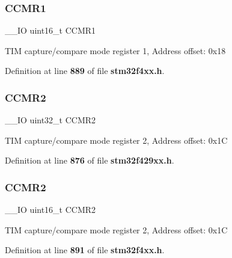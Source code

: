 \mbox{\label{structTIM__TypeDef_a90d89aec51d8012b8a565ef48333b24b}} 
\subsubsection{C\+C\+M\+R1\hspace{0.1cm}{\footnotesize\ttfamily [2/2]}}
{\footnotesize\ttfamily \+\_\+\+\_\+\+IO uint16\+\_\+t C\+C\+M\+R1}

T\+IM capture/compare mode register 1, Address offset\+: 0x18 

Definition at line \textbf{ 889} of file \textbf{ stm32f4xx.\+h}.

\mbox{\label{structTIM__TypeDef_a091452256c9a16c33d891f4d32b395bf}} 
\subsubsection{C\+C\+M\+R2\hspace{0.1cm}{\footnotesize\ttfamily [1/2]}}
{\footnotesize\ttfamily \+\_\+\+\_\+\+IO uint32\+\_\+t C\+C\+M\+R2}

T\+IM capture/compare mode register 2, Address offset\+: 0x1C 

Definition at line \textbf{ 876} of file \textbf{ stm32f429xx.\+h}.

\mbox{\label{structTIM__TypeDef_a977b3cf310388b5ad02440d64d03810a}} 
\subsubsection{C\+C\+M\+R2\hspace{0.1cm}{\footnotesize\ttfamily [2/2]}}
{\footnotesize\ttfamily \+\_\+\+\_\+\+IO uint16\+\_\+t C\+C\+M\+R2}

T\+IM capture/compare mode register 2, Address offset\+: 0x1C 

Definition at line \textbf{ 891} of file \textbf{ stm32f4xx.\+h}.

\mbox{\label{structTIM__TypeDef_adab1e24ef769bbcb3e3769feae192ffb}} 
